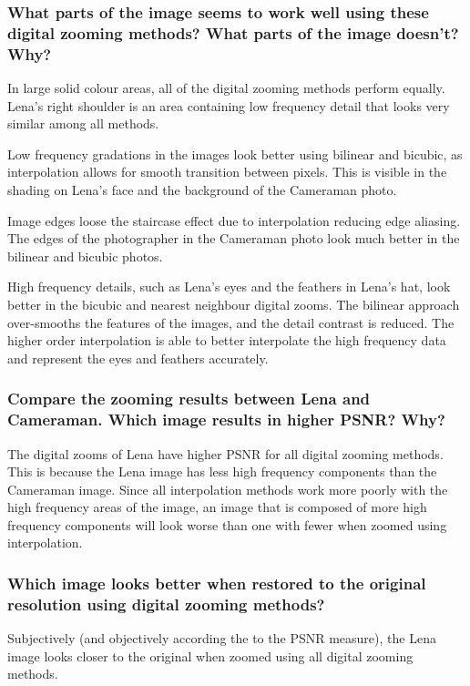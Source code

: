 \documentclass[article, 1.5space, letterpaper, 12pt, oneside, header, footer]{SydeClass}
\begin{document}
\subsubsection{What parts of the image seems to work well using these digital zooming methods? What parts of the
image doesn't? Why?}

In large solid colour areas, all of the digital zooming methods perform equally. Lena's right shoulder is an area containing low frequency detail that looks very similar among all methods.

Low frequency gradations in the images look better using bilinear and bicubic, as interpolation allows for smooth transition between pixels. This is visible in the shading on Lena's face and the background of the Cameraman photo.

Image edges loose the staircase effect due to interpolation reducing edge aliasing. The edges of the photographer in the Cameraman photo look much better in the bilinear and bicubic photos.


High frequency details, such as Lena's eyes and the feathers in Lena's hat, look better in the bicubic and nearest neighbour digital zooms. The bilinear approach over-smooths the features of the images, and the detail contrast is reduced. The higher order interpolation is able to better interpolate the high frequency data and represent the eyes and feathers accurately.


\subsubsection{Compare the zooming results between Lena and Cameraman. Which image results in higher PSNR? Why?}

The digital zooms of Lena have higher PSNR for all digital zooming methods. This is because the Lena image has less high frequency components than the Cameraman image. Since all interpolation methods work more poorly with the high frequency areas of the image, an image that is composed of more high frequency components will look worse than one with fewer when zoomed using interpolation.


\subsubsection{Which image looks better when restored to the original resolution using digital zooming methods?}

Subjectively (and objectively according the to the PSNR measure), the Lena image looks closer to the original when zoomed using all digital zooming methods.
\end{document}
